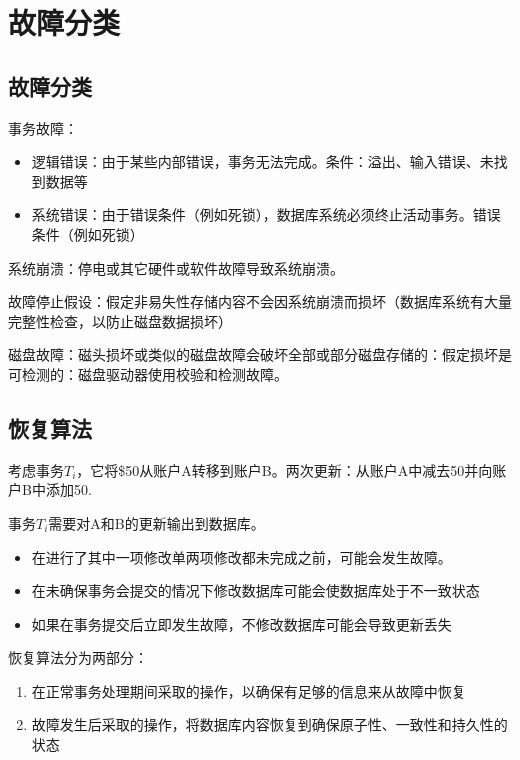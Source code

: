 \section{故障分类}

\subsection{故障分类}

事务故障：
\begin{itemize}
    \item 逻辑错误：由于某些内部错误，事务无法完成。条件：溢出、输入错误、未找到数据等
    \item 系统错误：由于错误条件（例如死锁），数据库系统必须终止活动事务。错误条件（例如死锁）
\end{itemize}

系统崩溃：停电或其它硬件或软件故障导致系统崩溃。

故障停止假设：假定非易失性存储内容不会因系统崩溃而损坏（数据库系统有大量完整性检查，以防止磁盘数据损坏）

磁盘故障：磁头损坏或类似的磁盘故障会破坏全部或部分磁盘存储的：假定损坏是可检测的：磁盘驱动器使用校验和检测故障。

\subsection{恢复算法}

考虑事务$T_i$，它将\$50从账户A转移到账户B。两次更新：从账户A中减去50并向账户B中添加50.

事务$T_i$需要对A和B的更新输出到数据库。
\begin{itemize}
    \item 在进行了其中一项修改单两项修改都未完成之前，可能会发生故障。
    \item 在未确保事务会提交的情况下修改数据库可能会使数据库处于不一致状态
    \item 如果在事务提交后立即发生故障，不修改数据库可能会导致更新丢失
\end{itemize}

恢复算法分为两部分：
\begin{enumerate}
    \item 在正常事务处理期间采取的操作，以确保有足够的信息来从故障中恢复
    \item 故障发生后采取的操作，将数据库内容恢复到确保原子性、一致性和持久性的状态
\end{enumerate}